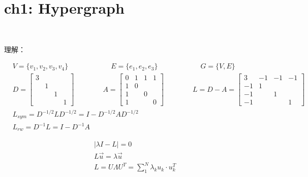 \documentclass{article}
\begin{document}
\section*{ch1: Hypergraph}


~ \\[3pt]
\begin{CJK}{UTF8}{gbsn}
    理解： \\[3pt]
\end{CJK}


%
\begin{align*}
    & V = \{ v_{1}, v_{2}, v_{3}, v_{4} \}  \qquad \qquad \qquad
    E = \{ e_{1}, e_{2}, e_{3} \}  \qquad \qquad \qquad
    G = \{ V, E \}  \\[12pt]
    & D = 
        \begin{bmatrix}
        3  &  &  & \\
        &  1  &  & \\
        &  &  1  & \\
        &  &  &  1
        \end{bmatrix} \qquad \qquad
      A = 
        \begin{bmatrix}
            0 & 1 & 1 & 1 \\
            1 & 0 &   &	  \\
            1 &   & 0 &	  \\
            1 &   &   & 0
        \end{bmatrix} \qquad \qquad
      L = D - A = 
        \begin{bmatrix}
            3 & -1 & -1 & -1 \\
            -1&  1 &    &	 \\
            -1&    &  1 &	 \\
            -1&    &    &  1
        \end{bmatrix}  \\[12pt]
    & L_{sym} = D^{-1/2}LD^{-1/2} = I - D^{-1/2}AD^{-1/2}  \\[3pt]
    & L_{rw} = D^{-1}L = I - D^{-1}A 
\end{align*}

%
\begin{align*}
    & \left | \lambda I - L \right | = 0  \\[3pt]
    & L \overrightarrow{u} = \lambda \overrightarrow{u}  \\[3pt]
    & L = U \Lambda U^{T} = \sum_{1}^{N} \lambda_{k} u_{k} \cdot u_{k}^{T} 
\end{align*}
\end{document}
